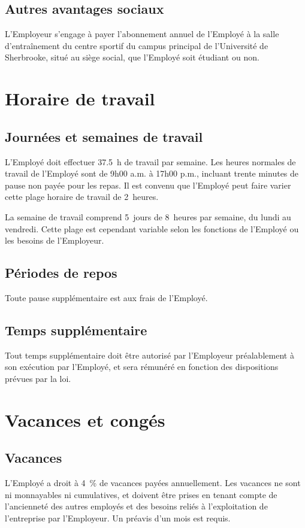 \documentclass{article}
\begin{document}
    	\subsection{Autres avantages sociaux}
    	L'Employeur s'engage à payer l'abonnement annuel de l'Employé à la salle d'entraînement du centre sportif du campus principal de l'Université de Sherbrooke, situé au siège social, que l'Employé soit étudiant ou non.
    	       	
    
    \section{Horaire de travail}
    	\subsection{Journées et semaines de travail}
    	L'Employé doit effectuer \SI{37,5}{h} de travail par semaine. Les heures normales de travail de l'Employé sont de 9h00 a.m. à 17h00 p.m., incluant trente minutes de pause non payée pour les repas. Il est convenu que l'Employé peut faire varier cette plage horaire de travail de 2~heures.
    	
    	La semaine de travail comprend 5~jours de 8~heures par semaine, du lundi au vendredi. Cette plage est cependant variable selon les fonctions de l'Employé ou les besoins de l'Employeur.
    	
    	\subsection{Périodes de repos}
    	Toute pause supplémentaire est aux frais de l'Employé.
    	
    	\subsection{Temps supplémentaire}
    	Tout temps supplémentaire doit être autorisé par l'Employeur préalablement à son exécution par l'Employé, et sera rémunéré en fonction des dispositions prévues par la loi.  	
    	
    \section{Vacances et congés}
    	\subsection{Vacances}
    	L'Employé a droit à \SI{4}{\%} de vacances payées annuellement. Les vacances ne sont ni monnayables ni cumulatives, et doivent être prises en tenant compte de l'ancienneté des autres employés et des besoins reliés à l'exploitation de l'entreprise par l'Employeur. Un préavis d'un mois est requis.    	
    	
\end{document}
